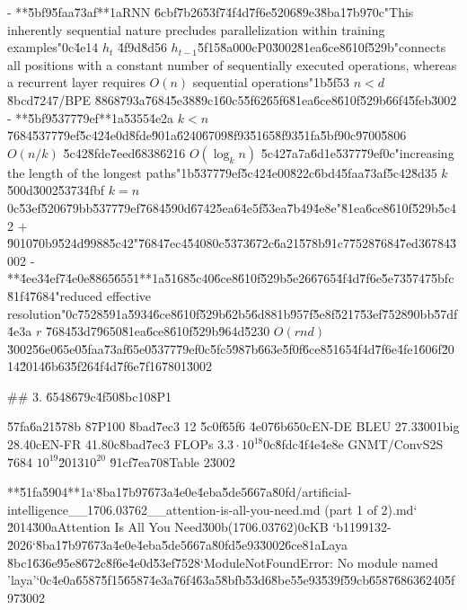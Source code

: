 \documentclass[10pt]{article}
\begin{document}
\begin{AnswerText}
- **\u5bf9\u5faa\u73af**\uff1aRNN \u6cbf\u7b26\u53f7\u4f4d\u7f6e\u5206\u89e3\u8ba1\u7b97\uff0c"This inherently sequential nature precludes parallelization within training examples"\uff0c\u4e14 $h_t$ \u4f9d\u8d56 $h_{t-1}$\u5f15\u8a00\uff0cP0\u3002\u81ea\u6ce8\u610f\u529b"connects all positions with a constant number of sequentially executed operations, whereas a recurrent layer requires $O(n)$ sequential operations"\uff1b\u5f53 $n<d$\u8bcd\u7247/BPE \u8868\u793a\u7684\u5e38\u89c1\u60c5\u5f62\u65f6\u81ea\u6ce8\u610f\u529b\u66f4\u5feb\u3002
- **\u5bf9\u5377\u79ef**\uff1a\u5355\u4e2a $k<n$ \u7684\u5377\u79ef\u5c42\u4e0d\u8fde\u901a\u6240\u6709\u8f93\u5165\u8f93\u51fa\u5bf9\uff0c\u9700\u5806 $O(n/k)$ \u5c42\u8fde\u7eed\u6838\u6216 $O(\log_k n)$ \u5c42\u7a7a\u6d1e\u5377\u79ef\uff0c"increasing the length of the longest paths"\uff1b\u5377\u79ef\u5c42\u4e00\u822c\u6bd4\u5faa\u73af\u5c42\u8d35 $k$ \u500d\u3002\u5373\u4fbf $k=n$\uff0c\u53ef\u5206\u79bb\u5377\u79ef\u7684\u590d\u6742\u5ea6\u4e5f\u53ea\u7b49\u4e8e"\u81ea\u6ce8\u610f\u529b\u5c42 + \u9010\u70b9\u524d\u9988\u5c42"\u7684\u7ec4\u5408\uff0c\u5373\u672c\u6a21\u578b\u91c7\u7528\u7684\u7ed3\u6784\u3002
- **\u4ee3\u4ef7\u4e0e\u8865\u6551**\uff1a\u5168\u5c40\u6ce8\u610f\u529b\u5e26\u6765\u4f4d\u7f6e\u5e73\u5747\u5bfc\u81f4\u7684"reduced effective resolution"\uff0c\u7528\u591a\u5934\u6ce8\u610f\u529b\u62b5\u6d88\uff1b\u957f\u5e8f\u5217\u53ef\u7528\u90bb\u57df\u4e3a $r$ \u7684\u53d7\u9650\u81ea\u6ce8\u610f\u529b\u964d\u5230 $O(rnd)$\u3002\u56e0\u65e0\u5faa\u73af\u65e0\u5377\u79ef\uff0c\u5fc5\u987b\u663e\u5f0f\u6ce8\u5165\u4f4d\u7f6e\u4fe1\u606f\u2014\u2014\u6b63\u5f26\u4f4d\u7f6e\u7f16\u7801\u3002

## 3. \u6548\u679c\u4f50\u8bc1\uff08P1

\u57fa\u6a21\u578b 8\xd7P100 \u8bad\u7ec3 12 \u5c0f\u65f6 \u4e07\u6b65\uff0cEN-DE BLEU 27.3\u3001big 28.4\uff0cEN-FR 41.8\uff0c\u8bad\u7ec3 FLOPs $3.3\cdot10^{18}$\uff0c\u8fdc\u4f4e\u4e8e GNMT/ConvS2S \u7684 $10^{19}$\u2013$10^{20}$ \u91cf\u7ea7\uff08Table 2\u3002

**\u51fa\u5904**\uff1a`\u8ba1\u7b97\u673a\u4e0e\u4eba\u5de5\u667a\u80fd/artificial-intelligence__1706.03762__attention-is-all-you-need.md (part 1 of 2).md` \u2014\u300aAttention Is All You Need\u300b(1706.03762)\uff0cKB `b1199132-\u2026`\u8ba1\u7b97\u673a\u4e0e\u4eba\u5de5\u667a\u80fd\u5e93\u3002\u6ce8\uff1aLaya \u8bc1\u636e\u95e8\u672c\u8f6e\u4e0d\u53ef\u7528`ModuleNotFoundError: No module named 'laya'`\uff0c\u4e0a\u6587\u5f15\u6587\u4e3a\u76f4\u63a5\u8bfb\u53d6\u8be5\u5e93\u539f\u59cb\u6587\u6863\u6240\u5f97\u3002
\end{AnswerText}
\end{document}
